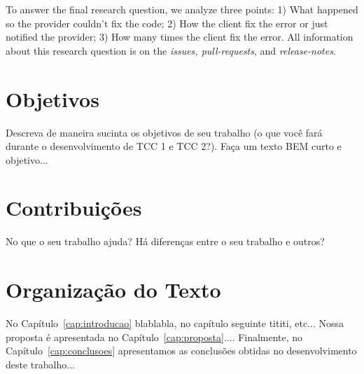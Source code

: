 To answer the final research question, we analyze three points: 1) What happened so the provider couldn’t fix the code; 2) How the client fix the error or just notified the provider; 3) How many times the client fix the error. All information about this research question is on the \textit{issues, pull-requests}, and \textit{release-notes}.

\section{Objetivos}
\label{cap:introducao:sec:objetivos}

Descreva de maneira sucinta os objetivos de seu trabalho (o que você fará durante o desenvolvimento de TCC 1 e TCC 2?). Faça um texto BEM curto e objetivo...

\section{Contribuições}
\label{cap:introducao:sec:contribuicoes}

No que o seu trabalho ajuda? Há diferenças entre o seu trabalho e outros?

\section{Organização do Texto}
\label{cap:introducao:sec:organizacao:texto}

No Capítulo~\ref{cap:introducao} blablabla, no capítulo seguinte tititi, etc... Nossa proposta é apresentada no Capítulo~\ref{cap:proposta}.... Finalmente, no Capítulo~\ref{cap:conclusoes} apresentamos as conclusões obtidas no desenvolvimento deste trabalho...